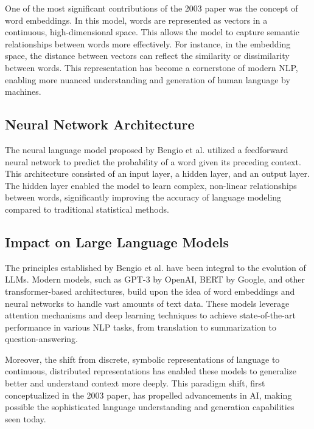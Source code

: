 One of the most significant contributions of the 2003 paper was the concept of word embeddings. In this model, words are represented as vectors in a continuous, high-dimensional space. This allows the model to capture semantic relationships between words more effectively. For instance, in the embedding space, the distance between vectors can reflect the similarity or dissimilarity between words. This representation has become a cornerstone of modern NLP, enabling more nuanced understanding and generation of human language by machines.

\subsection{Neural Network Architecture}

The neural language model proposed by Bengio et al. utilized a feedforward neural network to predict the probability of a word given its preceding context. This architecture consisted of an input layer, a hidden layer, and an output layer. The hidden layer enabled the model to learn complex, non-linear relationships between words, significantly improving the accuracy of language modeling compared to traditional statistical methods.

\subsection{Impact on Large Language Models}

The principles established by Bengio et al. have been integral to the evolution of LLMs. Modern models, such as GPT-3 by OpenAI, BERT by Google, and other transformer-based architectures, build upon the idea of word embeddings and neural networks to handle vast amounts of text data. These models leverage attention mechanisms and deep learning techniques to achieve state-of-the-art performance in various NLP tasks, from translation to summarization to question-answering.

Moreover, the shift from discrete, symbolic representations of language to continuous, distributed representations has enabled these models to generalize better and understand context more deeply. This paradigm shift, first conceptualized in the 2003 paper, has propelled advancements in AI, making possible the sophisticated language understanding and generation capabilities seen today.



%
